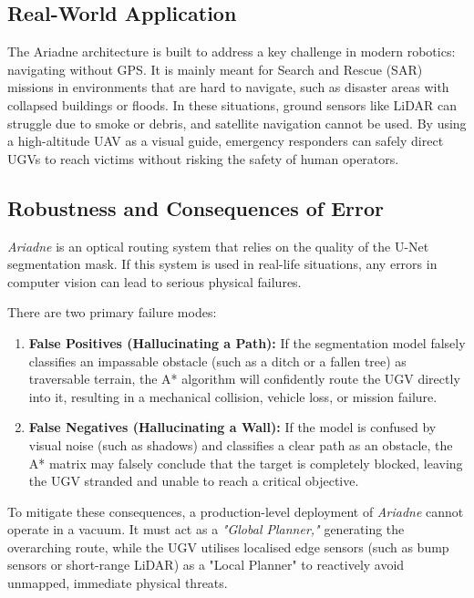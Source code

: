 \documentclass[12pt, a4paper]{article}
\begin{document}
\subsection{Real-World Application}

\quad The Ariadne architecture is built to address a key challenge in modern robotics: navigating without GPS. It is mainly meant for Search and Rescue (SAR) missions in environments that are hard to navigate, such as disaster areas with collapsed buildings or floods. In these situations, ground sensors like LiDAR can struggle due to smoke or debris, and satellite navigation cannot be used. By using a high-altitude UAV as a visual guide, emergency responders can safely direct UGVs to reach victims without risking the safety of human operators.

\vspace{0.5cm}

\subsection{Robustness and Consequences of Error}

\quad \textit{Ariadne} is an optical routing system that relies on the quality of the U-Net segmentation mask. If this system is used in real-life situations, any errors in computer vision can lead to serious physical failures.

\vspace{0.5cm}

\hspace{-1.5em}There are two primary failure modes:

\begin{enumerate}
  \item \textbf{False Positives (Hallucinating a Path):} If the segmentation model falsely classifies an impassable obstacle (such as a ditch or a fallen tree) as traversable terrain, the A* algorithm will confidently route the UGV directly into it, resulting in a mechanical collision, vehicle loss, or mission failure.
  
  \item \textbf{False Negatives (Hallucinating a Wall):} If the model is confused by visual noise (such as shadows) and classifies a clear path as an obstacle, the A* matrix may falsely conclude that the target is completely blocked, leaving the UGV stranded and unable to reach a critical objective.
\end{enumerate}

\hspace{-1.5em}To mitigate these consequences, a production-level deployment of \textit{Ariadne} cannot operate in a vacuum. It must act as a \textit{"Global Planner,"} generating the overarching route, while the UGV utilises localised edge sensors (such as bump sensors or short-range LiDAR) as a "Local Planner" to reactively avoid unmapped, immediate physical threats.
\end{document}
